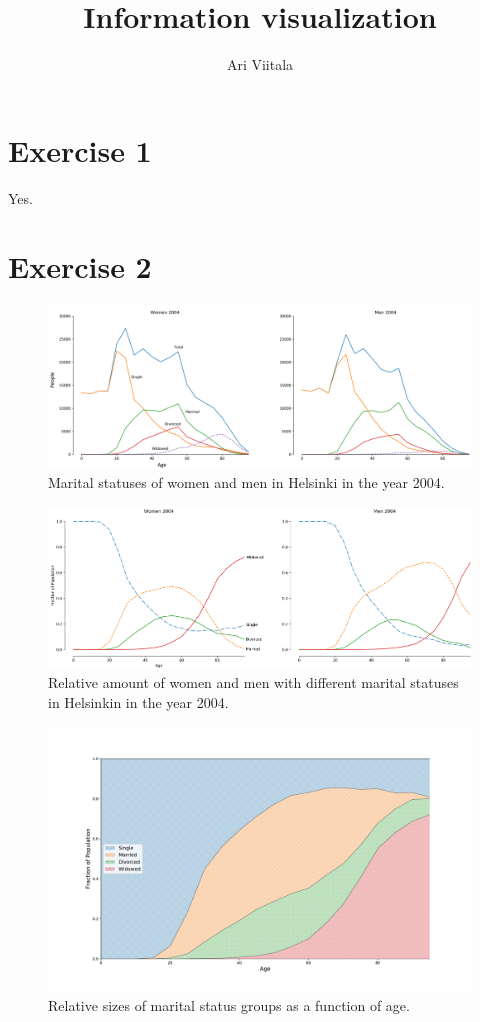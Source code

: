 \documentclass{article}
\title{Information visualization}
\author{Ari Viitala}
\begin{document}
	\maketitle

\section*{Exercise 1}
Yes.
\section*{Exercise 2}

\begin{figure}
\centering
\includegraphics[width = \linewidth]{absolute}
\caption{Marital statuses of women and men in Helsinki in the year 2004.}
\label{absolute}
\end{figure}

\begin{figure}
	\centering
	\includegraphics[width = \linewidth]{relative}
	\caption{Relative amount of women and men with different marital statuses in Helsinkin in the year 2004.}
	\label{relative}
\end{figure}

\begin{figure}
	\centering
	\includegraphics[width = \linewidth]{cumulative}
	\caption{Relative sizes of marital status groups as a function of age.}
	\label{cumulative}
\end{figure}
\end{document}
